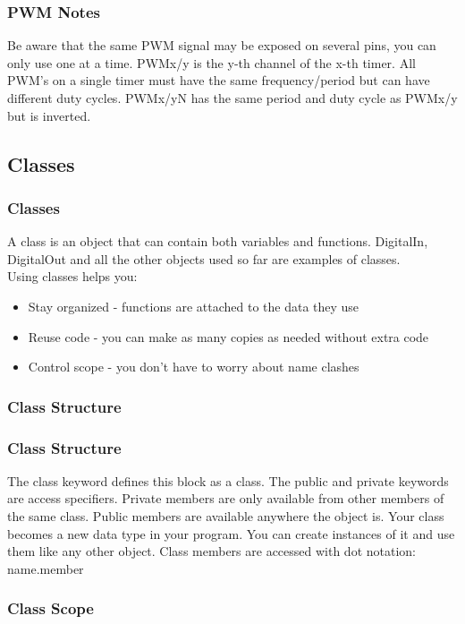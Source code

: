 \begin{frame}
	\frametitle{PWM Notes}
	Be aware that the same PWM signal may be exposed on several pins, you can only use one at a time.
	\vfill
	PWMx/y is the y-th channel of the x-th timer. All PWM's on a single timer must have the same frequency/period but can have different duty cycles.
	\vfill
	PWMx/yN has the same period and duty cycle as PWMx/y but is inverted.
\end{frame}

\subsection{Classes}
\label{sub:classes}
\begin{frame}
	\frametitle{Classes}
	A class is an object that can contain both variables and functions.
	DigitalIn, DigitalOut and all the other objects used so far are examples of classes.\\
	\vfill
	Using classes helps you:
	\begin{itemize}
		\item Stay organized - functions are attached to the data they use
		\item Reuse code - you can make as many copies as needed without extra code
		\item Control scope - you don't have to worry about name clashes
	\end{itemize}
\end{frame}

\begin{frame}[fragile]
	\frametitle{Class Structure}
	
\end{frame}

\begin{frame}[fragile]
	\frametitle{Class Structure}
	The {\ttfamily class} keyword defines this block as a class.
	\vfill
	The {\ttfamily public} and {\ttfamily private} keywords are access specifiers.
	Private members are only available from other members of the same class.
	Public members are available anywhere the object is.
	\vfill
	Your class becomes a new data type in your program.
	You can create instances of it and use them like any other object.
	\vfill
	Class members are accessed with dot notation: {\ttfamily name.member}
\end{frame}

\begin{frame}
	\frametitle{Class Scope}
\end{frame}

